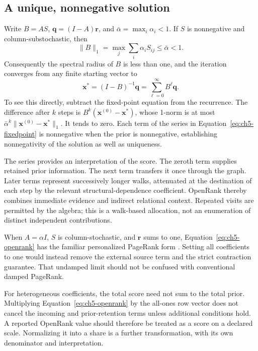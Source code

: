 \subsection{A unique, nonnegative solution}
Write \(B=AS\), \(\boldsymbol q=(I-A)\boldsymbol r\), and \(\bar\alpha=\max_i\alpha_i<1\). If \(S\) is nonnegative and column-substochastic, then
\begin{equation}
 \lVert B\rVert_1
 =\max_j\sum_i\alpha_iS_{ij}
 \leq\bar\alpha<1.
 \label{eq:ch5-contraction}
\end{equation}
Consequently the spectral radius of \(B\) is less than one, and the iteration converges from any finite starting vector to
\begin{equation}
 \boldsymbol x^*
 =(I-B)^{-1}\boldsymbol q
 =\sum_{\ell=0}^{\infty}B^\ell\boldsymbol q.
 \label{eq:ch5-fixedpoint}
\end{equation}
To see this directly, subtract the fixed-point equation from the recurrence. The difference after \(k\) steps is \(B^k(\boldsymbol x^{(0)}-\boldsymbol x^*)\), whose 1-norm is at most \(\bar\alpha^k\lVert\boldsymbol x^{(0)}-\boldsymbol x^*\rVert_1\). It tends to zero. Each term of the series in Equation~\ref{eq:ch5-fixedpoint} is nonnegative when the prior is nonnegative, establishing nonnegativity of the solution as well as uniqueness.

The series provides an interpretation of the score. The zeroth term supplies retained prior information. The next term transfers it once through the graph. Later terms represent successively longer walks, attenuated at the destination of each step by the relevant structural-dependence coefficient. OpenRank thereby combines immediate evidence and indirect relational context. Repeated visits are permitted by the algebra; this is a walk-based allocation, not an enumeration of distinct independent contributions.

When \(A=\alpha I\), \(S\) is column-stochastic, and \(\boldsymbol r\) sums to one, Equation~\ref{eq:ch5-openrank} has the familiar personalized PageRank form \citep{gleich2015}. Setting all coefficients to one would instead remove the external source term and the strict contraction guarantee. That undamped limit should not be confused with conventional damped PageRank.

For heterogeneous coefficients, the total score need not sum to the total prior. Multiplying Equation~\ref{eq:ch5-openrank} by the all-ones row vector does not cancel the incoming and prior-retention terms unless additional conditions hold. A reported OpenRank value should therefore be treated as a score on a declared scale. Normalizing it into a share is a further transformation, with its own denominator and interpretation.


